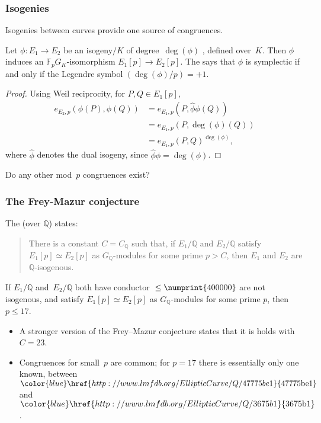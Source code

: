 \documentclass[handout]{beamer}
\newcommand{\Q}{\mathbb Q}
\newcommand{\F}{\mathbb F}
\newcommand{\lmfdbec}[3]{\color{blue}\href{http://www.lmfdb.org/EllipticCurve/Q/#1#2#3}{{\text{\rm#1#2#3}}}}
\newcommand{\high}[1]{\emph{\color{blue}{#1}}}
\begin{document}
\begin{frame}\frametitle{Isogenies}
  Isogenies between curves provide one source of congruences.
  \pause\medskip

  Let $\phi:E_1\to E_2$ be an isogeny$/K$ of degree~$\deg(\phi)$
  \high{coprime to $p$}, defined over~$K$.  Then $\phi$ induces an
  $\F_pG_K$-isomorphism $E_1[p]\to E_2[p]$.  The \high{isogeny criterion}
  says that $\phi$ is symplectic if and only if the Legendre symbol
  $({\deg(\phi)}/{p})=+1$.
  \pause\medskip

  \begin{proof}
    Using Weil reciprocity, for $P,Q\in E_1[p]$,
    \[
    \begin{aligned}
      e_{E_2,p}(\phi(P), \phi(Q)) &= e_{E_1,p}(P, \hat\phi\phi(Q)) \\
      &= e_{E_1,p}(P, \deg(\phi)(Q))\\ &= e_{E_1,p}(P,
      Q)^{\deg(\phi)},
    \end{aligned}
  \]
  where $\hat{\phi}$ denotes the dual isogeny, since $\hat\phi\phi=\deg(\phi)$.
  \end{proof}
  \pause\medskip

  Do any other mod~$p$ congruences exist?
\end{frame}

\begin{frame}\frametitle{The Frey-Mazur conjecture}
  The \high{Uniform Frey--Mazur conjecture} (over $\Q$) states:

  \begin{quote}There is a constant $C=C_{\Q}$ such that, if $E_1/\Q$ and $E_2/\Q$
  satisfy $E_1[p] \simeq E_2[p]$ as $G_\Q$-modules for some prime $p >
  C$, then $E_1$ and $E_2$ are $\Q$-isogenous.
  \end{quote}

  \pause\medskip

  \begin{theorem}[C. \& Freitas]
  If $E_1/\Q$ and~$E_2/\Q$ both have conductor ${}\le\numprint{400000}$
  are not isogenous, and satisfy $E_1[p] \simeq E_2[p]$ as
  $G_\Q$-modules for some prime $p$, then $p\le17$.
  \end{theorem}

  \pause\medskip
  \begin{itemize}
    \item A stronger version of the Frey--Mazur conjecture states that
      it is holds with $C=23$.
      \item Congruences for small~$p$ are common; for $p=17$ there is
        essentially only one known, between $\lmfdbec{47775}{be}{1}$
        and~$\lmfdbec{3675}{b}{1}$.
  \end{itemize}

\end{frame}
\end{document}
